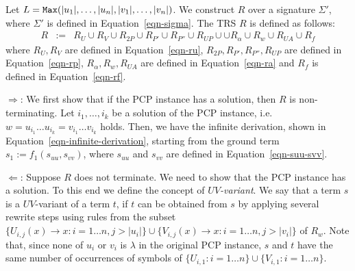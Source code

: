 \documentclass{LMCS}
\theoremstyle{plain}
\newcommand\ignore[1]{}
\begin{document}
Let $L={\tt Max}(|u_1|,\ldots,|u_n|,|v_1|,\ldots,|v_n|)$.
We construct $R$ over a signature $\Sigma'$, where $\Sigma'$ is defined in
Equation~\ref{eqn-sigma}.
The TRS $R$ is defined as follows:
\begin{eqnarray*}
R & := & R_U \cup R_V \cup R_{2P} \cup R_{P'}\cup R_{P''}\cup R_{UP}\cup \cup R_{\alpha}\cup R_{w} \cup R_{UA} \cup R_f
\end{eqnarray*}
where 
$R_U,R_V$ are defined in Equation~\ref{eqn-ru},
$R_{2P},R_{P'},R_{P''},R_{UP}$ are defined in Equation~\ref{eqn-rp},
$R_{\alpha},R_{w},R_{UA}$ are defined in Equation~\ref{eqn-ra}
and
$R_f$ is defined in Equation~\ref{eqn-rf}.

\ignore{
In order to see how this works, we will call
$U_i(x)$ to the term $U_{i,1}\ldots U_{i,L}(x)$,
$V_i(x)$ to the term $V_{i,1}\ldots V_{i,L}(x)$,
$P_i(x)$ to the term $P_{i,1}\ldots P_{i,L}(x)$,

We want to see that, if there is a solution of the original PCP
problem, then the resulting TRS is not terminating.
\endignore}

$\Rightarrow$:
We first show that if the PCP instance has a solution, then
$R$ is non-terminating.
Let $i_1,\ldots,i_k$
be a solution of the PCP instance,
i.e.\ $w=u_{i_1}\ldots u_{i_k}=v_{i_1}\ldots v_{i_k}$ holds.
Then, we have the infinite derivation, shown in Equation~\ref{eqn-infinite-derivation},
starting from the ground term $s_1 := f_1(s_{uu}, s_{vv})$, where
$s_{uu}$ and $s_{vv}$ are defined in Equation~\ref{eqn-suu-svv}.


$\Leftarrow$:
Suppose $R$ does not terminate. We need to show that the PCP 
instance has a solution.
To this end we define the concept of {\em $UV$-variant}.
We say that a term $s$ is a $UV$-variant of a term $t$, if
$t$ can be obtained from $s$ by applying several rewrite
steps using rules from the subset
$\{U_{i,j}(x)\rightarrow x: i=1\ldots n,j>|u_i|\}
\cup \{V_{i,j}(x)\rightarrow x: i=1\ldots n,j>|v_i|\}$ of $R_w$.
Note that, since none of $u_i$ or $v_i$ is $\lambda$ in 
the original PCP instance,
$s$ and $t$ have the same number
of occurrences of symbols of $\{U_{i,1}:i=1\ldots n\}\cup
\{V_{i,1}:i=1\ldots n\}$.
\end{document}
